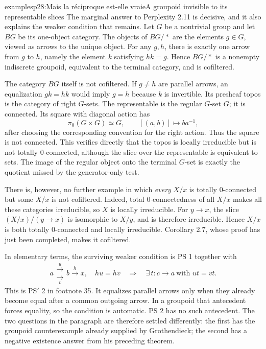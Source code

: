 \begin{dcomment}{examples}{p28:Mais la réciproque est-elle vraie}{A groupoid invisible to its representable slices}
The marginal answer to Perplexity 2.11 is decisive, and it also explains the weaker condition that remains. Let $G$ be a nontrivial group and let $BG$ be its one-object category. The objects of $BG/*$ are the elements $g\in G$, viewed as arrows to the unique object. For any $g,h$, there is exactly one arrow from $g$ to $h$, namely the element $k$ satisfying $hk=g$. Hence $BG/*$ is a nonempty indiscrete groupoid, equivalent to the terminal category, and is cofiltered.

The category $BG$ itself is not cofiltered. If $g\ne h$ are parallel arrows, an equalization $gk=hk$ would imply $g=h$ because $k$ is invertible. Its presheaf topos is the category of right $G$-sets. The representable is the regular $G$-set $G$; it is connected. Its square with diagonal action has
\[
 \pi _0(G\times G)\simeq G,
 \qquad [(a,b)]\longmapsto ba^{-1},
\]
after choosing the corresponding convention for the right action. Thus the square is not connected. This verifies directly that the topos is locally irreducible but is not totally $0$-connected, although the slice over the representable is equivalent to sets. The image of the regular object onto the terminal $G$-set is exactly the quotient missed by the generator-only test.

There is, however, no further example in which \emph{every} $X/x$ is totally $0$-connected but some $X/x$ is not cofiltered. Indeed, total $0$-connectedness of all $X/x$ makes all these categories irreducible, so $X$ is locally irreducible. For $y\to x$, the slice $(X/x)/(y\to x)$ is isomorphic to $X/y$, and is therefore irreducible. Hence $X/x$ is both totally $0$-connected and locally irreducible. Corollary 2.7, whose proof has just been completed, makes it cofiltered.

In elementary terms, the surviving weaker condition is PS 1 together with
\[
 a\mathrel{\substack{\xrightarrow{u}\\[-.5ex]\xrightarrow[v]{}}}b
 \xrightarrow{h}x,\quad hu=hv
 \quad\Longrightarrow\quad
 \exists\,t:c\to a\ \text{with }ut=vt.
\]
This is PS$'$ 2 in footnote 35. It equalizes parallel arrows only when they already become equal after a common outgoing arrow. In a groupoid that antecedent forces equality, so the condition is automatic. PS 2 has no such antecedent. The two questions in the paragraph are therefore settled differently: the first has the groupoid counterexample already supplied by Grothendieck; the second has a negative existence answer from his preceding theorem.
\end{dcomment}

